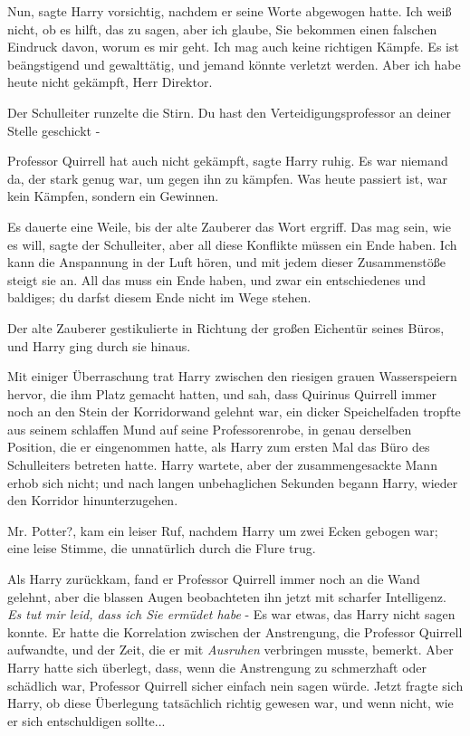 \glqq{}Nun\grqq{}, sagte Harry vorsichtig, nachdem er seine Worte abgewogen
hatte. \glqq{}Ich weiß nicht, ob es hilft, das zu sagen, aber ich glaube, Sie
bekommen einen falschen Eindruck davon, worum es mir geht. Ich mag auch keine
richtigen Kämpfe. Es ist beängstigend und gewalttätig, und jemand könnte
verletzt werden. Aber ich habe heute nicht gekämpft, Herr Direktor.\grqq{}

Der Schulleiter runzelte die Stirn. \glqq{}Du hast den Verteidigungsprofessor an
deiner Stelle geschickt -\grqq{}

\glqq{}Professor Quirrell hat auch nicht gekämpft\grqq{}, sagte Harry ruhig.
\glqq{}Es war niemand da, der stark genug war, um gegen ihn zu kämpfen. Was heute
passiert ist, war kein Kämpfen, sondern ein Gewinnen.\grqq{}

Es dauerte eine Weile, bis der alte Zauberer das Wort ergriff. \glqq{}Das mag
sein, wie es will\grqq{}, sagte der Schulleiter, \glqq{}aber all diese Konflikte
müssen ein Ende haben. Ich kann die Anspannung in der Luft hören, und mit jedem
dieser Zusammenstöße steigt sie an. All das muss ein Ende haben, und zwar ein
entschiedenes und baldiges; du darfst diesem Ende nicht im Wege stehen.\grqq{}

Der alte Zauberer gestikulierte in Richtung der großen Eichentür seines Büros,
und Harry ging durch sie hinaus.

Mit einiger Überraschung trat Harry zwischen den riesigen grauen Wasserspeiern
hervor, die ihm Platz gemacht hatten, und sah, dass Quirinus Quirrell immer noch
an den Stein der Korridorwand gelehnt war, ein dicker Speichelfaden tropfte aus
seinem schlaffen Mund auf seine Professorenrobe, in genau derselben Position,
die er eingenommen hatte, als Harry zum ersten Mal das Büro des Schulleiters
betreten hatte. Harry wartete, aber der zusammengesackte Mann erhob sich nicht;
und nach langen unbehaglichen Sekunden begann Harry, wieder den Korridor
hinunterzugehen.

\glqq{}Mr. Potter?\grqq{}, kam ein leiser Ruf, nachdem Harry um zwei Ecken
gebogen war; eine leise Stimme, die unnatürlich durch die Flure trug.

Als Harry zurückkam, fand er Professor Quirrell immer noch an die Wand gelehnt,
aber die blassen Augen beobachteten ihn jetzt mit scharfer Intelligenz. \emph{Es
tut mir leid, dass ich Sie ermüdet habe} - Es war etwas, das Harry nicht sagen
konnte. Er hatte die Korrelation zwischen der Anstrengung, die Professor
Quirrell aufwandte, und der Zeit, die er mit \glqq{}\emph{Ausruhen}\grqq{}
verbringen musste, bemerkt. Aber Harry hatte sich überlegt, dass, wenn die
Anstrengung zu schmerzhaft oder schädlich war, Professor Quirrell sicher einfach
nein sagen würde. Jetzt fragte sich Harry, ob diese Überlegung tatsächlich
richtig gewesen war, und wenn nicht, wie er sich entschuldigen sollte...

